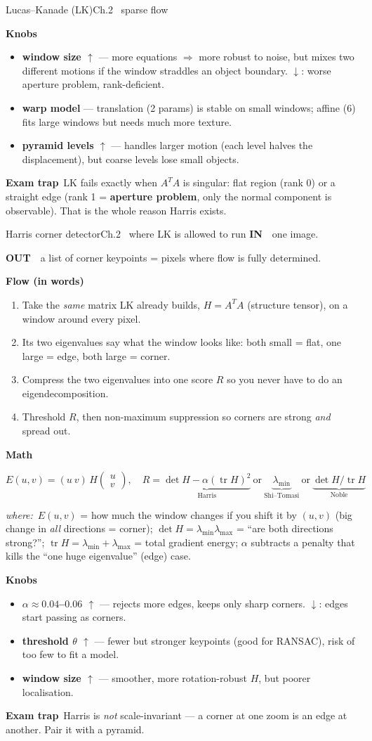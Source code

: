 \documentclass[9pt,a4paper]{extarticle}
\newcommand{\IN}{\textbf{\color{cIn}IN}\ }
\newcommand{\OUT}{\par\textbf{\color{cOut}OUT}\ }
\newcommand{\FLOW}{\par\smallskip\textbf{Flow (in words)}\par\nopagebreak}
\newcommand{\MATH}{\par\smallskip\textbf{Math}\par\nopagebreak}
\newcommand{\KNOBS}{\par\smallskip\textbf{Knobs}\par\nopagebreak}
\newcommand{\TRAP}{\par\smallskip\textbf{\color{cTrap}Exam trap}\ }
\newcommand{\WHERE}{\par\textit{where:}\ }
\newcommand{\up}{$\uparrow$}
\newcommand{\dn}{$\downarrow$}
\newcommand{\kn}[2]{\item \textbf{#1} --- #2}
\begin{document}
\begin{card}{Lucas--Kanade (LK)}{Ch.2 \textbullet\ sparse flow}
\KNOBS
\begin{itemize}
  \kn{window size \up}{more equations $\Rightarrow$ more robust to noise, but mixes two different motions if the window straddles an object boundary. \dn: worse aperture problem, rank-deficient.}
  \kn{warp model}{translation (2 params) is stable on small windows; affine (6) fits large windows but needs much more texture.}
  \kn{pyramid levels \up}{handles larger motion (each level halves the displacement), but coarse levels lose small objects.}
\end{itemize}
\TRAP LK fails exactly when $A^TA$ is singular: flat region (rank 0) or a straight edge (rank 1 = \textbf{aperture problem}, only the normal component is observable). That is the whole reason Harris exists.
\end{card}

\begin{card}{Harris corner detector}{Ch.2 \textbullet\ where LK is allowed to run}
\IN\ one image.
\OUT\ a list of corner keypoints = pixels where flow is fully determined.

\FLOW
\begin{enumerate}
  \item Take the \emph{same} matrix LK already builds, $H=A^TA$ (structure tensor), on a window around every pixel.
  \item Its two eigenvalues say what the window looks like: both small = flat, one large = edge, both large = corner.
  \item Compress the two eigenvalues into one score $R$ so you never have to do an eigendecomposition.
  \item Threshold $R$, then non-maximum suppression so corners are strong \emph{and} spread out.
\end{enumerate}

\MATH
\[ E(u,v)=(u\ v)\,H\begin{pmatrix}u\\v\end{pmatrix},\quad
R=\underbrace{\det H-\alpha(\operatorname{tr}H)^2}_{\text{Harris}}\ \text{or}\ \underbrace{\lambda_{\min}}_{\text{Shi--Tomasi}}\ \text{or}\ \underbrace{\det H/\operatorname{tr}H}_{\text{Noble}} \]
\WHERE $E(u,v)$ = how much the window changes if you shift it by $(u,v)$ (big change in \emph{all} directions = corner); $\det H=\lambda_{\min}\lambda_{\max}$ = ``are both directions strong?''; $\operatorname{tr}H=\lambda_{\min}+\lambda_{\max}$ = total gradient energy; $\alpha$ subtracts a penalty that kills the ``one huge eigenvalue'' (edge) case.

\KNOBS
\begin{itemize}
  \kn{$\alpha\approx0.04$--$0.06$ \up}{rejects more edges, keeps only sharp corners. \dn: edges start passing as corners.}
  \kn{threshold $\theta$ \up}{fewer but stronger keypoints (good for RANSAC), risk of too few to fit a model.}
  \kn{window size \up}{smoother, more rotation-robust $H$, but poorer localisation.}
\end{itemize}
\TRAP Harris is \emph{not} scale-invariant --- a corner at one zoom is an edge at another. Pair it with a pyramid.
\end{card}
\end{document}
